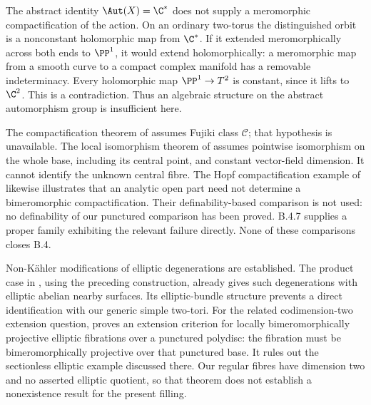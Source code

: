 \begin{remark}
The abstract identity $\Aut(X)=\C^*$ does not supply a
meromorphic compactification of the action. On an ordinary
two-torus the distinguished orbit is a nonconstant holomorphic
map from $\C^*$. If it extended meromorphically across both
ends to $\PP^1$, it would extend holomorphically: a
meromorphic map from a smooth curve to a compact complex
manifold has a removable indeterminacy. Every holomorphic
map $\PP^1\to T^2$ is constant, since it lifts to $\C^2$.
This is a contradiction. Thus an algebraic structure on the
abstract automorphism group is insufficient here.

The compactification theorem of
\citet[Theorem 1.2]{BiliottiGhigi2021Root} assumes Fujiki
class $\mathcal C$; that hypothesis is unavailable.
The local isomorphism theorem of
\citet[Theorem 3]{Meersseman2011Root} assumes pointwise
isomorphism on the whole base, including its central point,
and constant vector-field dimension. It cannot identify the
unknown central fibre. The Hopf compactification example of
\citet[Example 1]{KatzarkovEtAl2025Root} likewise illustrates
that an analytic open part need not determine a bimeromorphic
compactification. Their definability-based comparison is not
used: no definability of our punctured comparison has been
proved. B.4.7 supplies a proper family exhibiting the relevant
failure directly. None of these comparisons closes B.4.

Non-K\"ahler modifications of elliptic degenerations are
established. The product case in
\citet[Section 3, Example 3.4(1)]{Fujimoto1988Root}, using
the preceding construction, already gives such degenerations
with elliptic abelian nearby surfaces. Its elliptic-bundle
structure prevents a direct identification with our generic
simple two-tori. For the related codimension-two extension
question, \citet[Theorem 7.1.3]{Nakayama2002Root} proves an
extension criterion for locally bimeromorphically projective
elliptic fibrations over a punctured polydisc: the fibration
must be bimeromorphically projective over that punctured base.
It rules out the sectionless elliptic example discussed there.
Our regular fibres have dimension two and no asserted elliptic
quotient, so that theorem does not establish a nonexistence
result for the present filling.
\end{remark}
